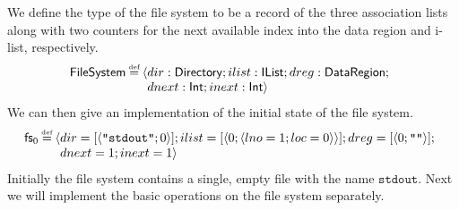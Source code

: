 \documentclass[12pt,phd,lfcs,twoside,openright,logo,leftchapter,normalheadings]{infthesis}
\theoremstyle{plain}
\theoremstyle{definition}
\begin{document}
We define the type of the file system to be a record of the three
association lists along with two counters for the next available index
into the data region and i-list, respectively.
%
\[
  \FileSystem \defas \Record{
    \ba[t]{@{}l}
      dir:\Directory;ilist:\IList;dreg:\DataRegion;\\
      dnext:\Int;inext:\Int}
    \ea
\]
%
We can then give an implementation of the initial state of the file
system.
%
\[
  \dec{fs}_0 \defas \Record{
    \ba[t]{@{}l}
      dir=[\Record{\strlit{stdout};0}];ilist=[\Record{0;\Record{lno=1;loc=0}}];dreg=[\Record{0;\strlit{}}];\\
      dnext=1;inext=1}
    \ea
\]
%
Initially the file system contains a single, empty file with the name
$\texttt{stdout}$. Next we will implement the basic operations on the
file system separately.
\end{document}
